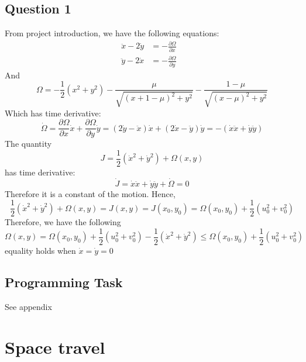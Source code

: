 \documentclass[11pt]{article}
\begin{document}
\subsection{Question 1}
From project introduction, we have the following equations:
\begin{align*}
\ddot{x} - 2\dot{y} &= -\frac{\partial \Omega}{\partial x}    
&\tag{1.1a}\\
\ddot{y} - 2\dot{x} &= -\frac{\partial \Omega}{\partial y}
  &\tag{1.1b}
\end{align*}
And
\begin{equation*}
\Omega = -\frac{1}{2}(x^{2}+y^{2})-\frac{\mu}{\sqrt{(x+1-\mu)^{2}+y^{2}}}-\frac{1-\mu}{\sqrt{{(x-\mu)}^{2}+y^{2}}} \tag{1.2}
\end{equation*}
Which has time derivative:
$$\dot{\Omega} = \frac{\partial \Omega}{\partial x} \dot{x}+\frac{\partial \Omega}{\partial y} \dot{y} = (2\dot{y}-\ddot{x})\dot{x}+(2\dot{x}-\ddot{y})\dot{y}= -(\dot{x} \ddot{x}+\dot{y} \ddot{y}) $$
The quantity $$ \mathit{J} = \frac{1}{2}({\dot{x}}^{2}+{\dot{y}}^{2})+\Omega(x,y)$$ has time derivative:
$$\dot{\mathit{J}} = \dot{x}\ddot{x}+\dot{y}\ddot{y}+\dot{\Omega} = 0$$
Therefore it is a constant of the motion.
Hence, $$\frac{1}{2}({\dot{x}}^{2}+{\dot{y}}^{2})+\Omega(x,y) = \mathit{J}(x, y) = \mathit{J}(x_{0},y_{0}) = \Omega(x_{0},y_{0})+\frac{1}{2}(u_{0}^{2}+v_{0}^{2}) $$
Therefore, we have the following
$$\Omega(x,y) = \Omega(x_{0},y_{0})+\frac{1}{2}(u_{0}^{2}+v_{0}^{2})-\frac{1}{2}({{\dot{x}}^{2}+{\dot{y}^{2}}})\leqslant\Omega(x_{0},y_{0})+\frac{1}{2}(u_{0}^{2}+v_{0}^{2})$$
equality holds when $\dot{x} = \dot{y} = 0$
\subsection*{Programming Task} See appendix
\section{Space travel}
\end{document}
